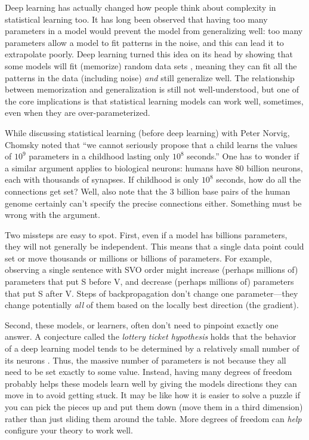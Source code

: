 \documentclass[output=paper,colorlinks,citecolor=brown
]{langscibook}
\begin{document}
Deep learning has actually changed how people think about complexity in statistical learning too. It has long been observed that having too many parameters in a model would prevent the model from generalizing well: too many parameters allow a model to fit patterns in the noise, and this can lead it to extrapolate poorly. Deep learning turned this idea on its head by showing that some models will fit (memorize) random data sets \citep{zhang2021understanding}, meaning they can fit all the patterns in the data (including noise) \emph{and} still generalize well. The relationship between memorization and generalization is still not well-understood, but one of the core implications is that statistical learning models can work well, sometimes, even when they are over-parameterized. 

While discussing statistical learning (before deep learning) with Peter Norvig, Chomsky noted that ``we cannot seriously propose that a child learns the values of $10^9$ parameters in a childhood lasting only $10^8$ seconds.'' One has to wonder if a similar argument applies to biological neurons: humans have $80$ billion neurons, each with thousands of synapses. If childhood is only $10^8$ seconds, how do all the connections get set? Well, also note that the $3$ billion base pairs of the human genome certainly can't specify the precise connections either. Something must be wrong with the argument. 

Two missteps are easy to spot. First, even if a model has billions parameters, they will not generally be independent. This means that a single data point could set or move thousands or millions or billions of parameters. For example, observing a single sentence with SVO order might increase (perhaps millions of) parameters that put S before V, and decrease (perhaps millions of) parameters that put S after V. Steps of backpropagation don't change one parameter---they change potentially \emph{all} of them based on the locally best direction (the gradient). 

Second, these models, or learners, often don't need to pinpoint exactly one answer. A conjecture called the \emph{lottery ticket hypothesis} holds that the behavior of a deep learning model tends to be determined by a relatively small number of its neurons \citep{frankle2018lottery}. Thus, the massive number of parameters is not because they all need to be set exactly to some value. Instead, having many degrees of freedom probably helps these models learn well by giving the models directions they can move in to avoid getting stuck. It may be like how it is easier to solve a puzzle if you can pick the pieces up and put them down (move them in a third dimension) rather than just sliding them around the table. More degrees of freedom can \emph{help} configure your theory to work well. 
\end{document}
